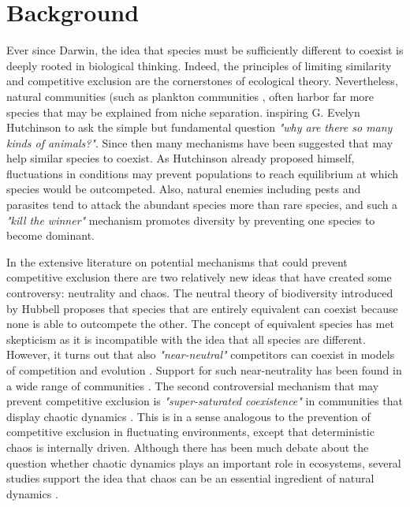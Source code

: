 \section{Background}
\label{sec:Background}
Ever since Darwin, the idea that species must be sufficiently different to coexist is deeply rooted in biological thinking. Indeed, the principles of limiting similarity \citep{MacArthur} and competitive exclusion \citep{Hardin1960} are the cornerstones of ecological theory. Nevertheless, natural communities (such as plankton communities \citep{Hutchinson1961}, often harbor far more species that may be explained from niche separation. inspiring G. Evelyn Hutchinson \citeyearpar{Hutchinson} to ask the simple but fundamental question \textit{"why are there so many kinds of animals?"}. Since then many mechanisms have been suggested that may help similar species to coexist. As Hutchinson \citeyearpar{Hutchinson1961} already proposed himself, fluctuations in conditions may prevent populations to reach equilibrium at which species would be outcompeted. Also, natural enemies including pests and parasites tend to attack the abundant species more than rare species, and such a \textit{"kill the winner"} \citep{Winter2010} mechanism promotes diversity by preventing one species to become dominant.

In the extensive literature on potential mechanisms that could prevent competitive exclusion there are two relatively new ideas that have created some controversy: neutrality and chaos. The neutral theory of biodiversity introduced by Hubbell \citeyearpar{Hubbell2001} proposes that species that are entirely equivalent can coexist because none is able to outcompete the other. The concept of equivalent species has met skepticism as it is incompatible with the idea that all species are different. However, it turns out that also \textit{"near-neutral"} competitors can coexist in models of competition and evolution \citep{Scheffer2006, Scheffer2018}. Support for such near-neutrality has been found in a wide range of communities \citep{Vergnon2013, Segura2013}. The second controversial mechanism that may prevent competitive exclusion is \textit{"super-saturated coexistence"} in communities that display chaotic dynamics \citep{Huisman1999}. This is in a sense analogous to the prevention of competitive exclusion in fluctuating environments, except that deterministic chaos is internally driven. Although there has been much debate about the question whether chaotic dynamics plays an important role in ecosystems, several studies support the idea that chaos can be an essential ingredient of natural dynamics \citep{Armstrong1980, Huisman1999, Beninca2008}.

